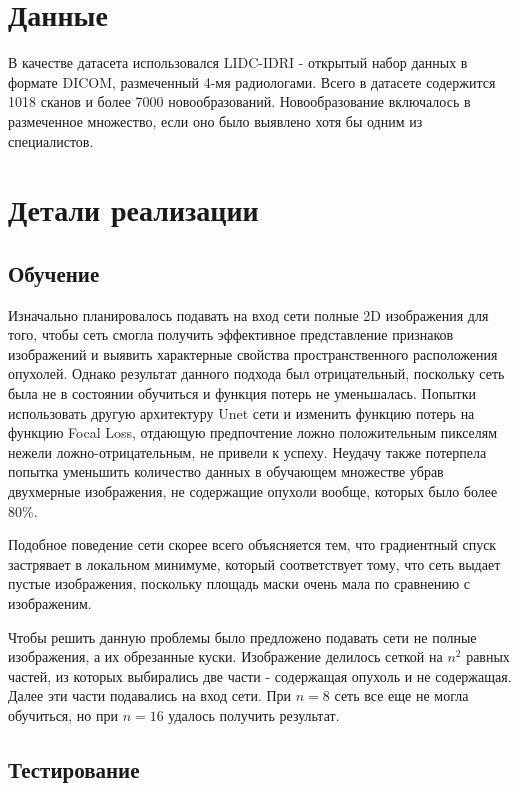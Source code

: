 

\section{Данные}

В качестве датасета использовался LIDC-IDRI \cite{lidc} - открытый набор данных в формате DICOM, размеченный 4-мя радиологами. Всего в датасете содержится 1018 сканов и более 7000 новообразований. Новообразование включалось в размеченное множество, если оно было выявлено хотя бы одним из специалистов.


\section{Детали реализации}

\subsection{Обучение}

Изначально планировалось подавать на вход сети полные 2D изображения для того, чтобы сеть смогла получить эффективное представление признаков изображений и выявить характерные свойства пространственного расположения опухолей. Однако результат данного подхода был отрицательный, поскольку сеть была не в состоянии обучиться и функция потерь не уменьшалась. Попытки использовать другую архитектуру Unet сети и изменить функцию потерь на функцию Focal Loss, отдающую предпочтение ложно положительным пикселям нежели ложно-отрицательным, не привели к успеху. Неудачу также потерпела попытка уменьшить количество данных в обучающем множестве убрав двухмерные изображения, не содержащие опухоли вообще, которых было более 80\%.

Подобное поведение сети скорее всего объясняется тем, что градиентный спуск застрявает в локальном минимуме, который соответствует тому, что сеть выдает пустые изображения, поскольку площадь маски очень мала по сравнению с изображеним.

Чтобы решить данную проблемы было предложено подавать сети не полные изображения, а их обрезанные куски. Изображение делилось сеткой на $n^2$ равных частей, из которых выбирались две части - содержащая опухоль и не содержащая. Далее эти части подавались на вход сети. При $n = 8$ сеть все еще не могла обучиться, но при $n = 16$ удалось получить результат.

\subsection{Тестирование}

